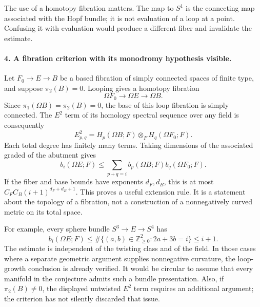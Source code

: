 \documentclass[11pt]{article}
\begin{document}
The use of a homotopy fibration matters. The map to $S^1$ is the connecting map associated with the Hopf bundle; it is not evaluation of a loop at a point. Confusing it with evaluation would produce a different fiber and invalidate the estimate.

\paragraph{4. A fibration criterion with its monodromy hypothesis visible.}
Let $F_0\to E\to B$ be a based fibration of simply connected spaces of finite type, and suppose $\pi_2(B)=0$. Looping gives a homotopy fibration
\[
 \Omega F_0\longrightarrow\Omega E\longrightarrow\Omega B.
\]
Since $\pi_1(\Omega B)=\pi_2(B)=0$, the base of this loop fibration is simply connected. The $E^2$ term of its homology spectral sequence over any field is consequently
\[
 E^2_{p,q}=H_p(\Omega B;F)\otimes_F H_q(\Omega F_0;F).
\]
Each total degree has finitely many terms. Taking dimensions of the associated graded of the abutment gives
\[
 b_i(\Omega E;F)\leq\sum_{p+q=i}b_p(\Omega B;F)b_q(\Omega F_0;F).
\]
If the fiber and base bounds have exponents $d_F,d_B$, this is at most $C_FC_B(i+1)^{d_F+d_B+1}$. This proves a useful extension rule. It is a statement about the topology of a fibration, not a construction of a nonnegatively curved metric on its total space.

For example, every sphere bundle $S^3\to E\to S^4$ has
\[
 b_i(\Omega E;F)\leq
 \#\{(a,b)\in\mathbb Z_{\geq0}^2:2a+3b=i\}\leq i+1.
\]
The estimate is independent of the twisting class and of the field. In those cases where a separate geometric argument supplies nonnegative curvature, the loop-growth conclusion is already verified. It would be circular to assume that every manifold in the conjecture admits such a bundle presentation. Also, if $\pi_2(B)\neq0$, the displayed untwisted $E^2$ term requires an additional argument; the criterion has not silently discarded that issue.
\end{document}
